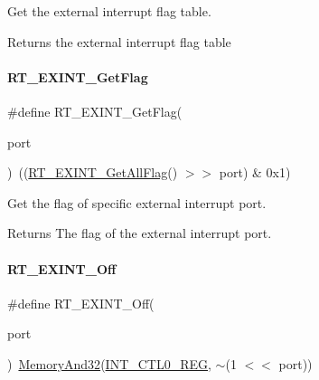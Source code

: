 Get the external interrupt flag table. 

\begin{DoxyReturn}{Returns}
the external interrupt flag table 
\end{DoxyReturn}
\mbox{\label{a00011_ae65409aaf69a9f495207ebbe133f161d}} 
\paragraph{\texorpdfstring{R\+T\+\_\+\+E\+X\+I\+N\+T\+\_\+\+Get\+Flag}{RT\_EXINT\_GetFlag}}
{\footnotesize\ttfamily \#define R\+T\+\_\+\+E\+X\+I\+N\+T\+\_\+\+Get\+Flag(\begin{DoxyParamCaption}\item[{}]{port }\end{DoxyParamCaption})~((\mbox{\hyperlink{a00011_ab8287fc872a2d0ae785c8b3b51a37a5e}{R\+T\+\_\+\+E\+X\+I\+N\+T\+\_\+\+Get\+All\+Flag}}() $>$$>$ port) \& 0x1)}



Get the flag of specific external interrupt port. 

\begin{DoxyReturn}{Returns}
The flag of the external interrupt port. 
\end{DoxyReturn}
\mbox{\label{a00011_aa1a62e0954243f0c0fc8ec850ea2eebe}} 
\paragraph{\texorpdfstring{R\+T\+\_\+\+E\+X\+I\+N\+T\+\_\+\+Off}{RT\_EXINT\_Off}}
{\footnotesize\ttfamily \#define R\+T\+\_\+\+E\+X\+I\+N\+T\+\_\+\+Off(\begin{DoxyParamCaption}\item[{}]{port }\end{DoxyParamCaption})~\mbox{\hyperlink{a00020_ad87cedffcaadc51db22594fce55173d4}{Memory\+And32}}(\mbox{\hyperlink{a00020_a8de95a7e93d24e973c34d5a2acb174d6}{I\+N\+T\+\_\+\+C\+T\+L0\+\_\+\+R\+EG}}, $\sim$(1 $<$$<$ port))}



